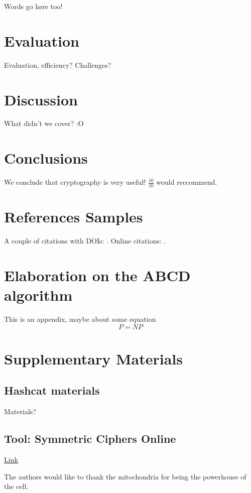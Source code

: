 \documentclass[acmlarge]{acmart}
\begin{document}
Words go here too!

\section{Evaluation}\label{sec:evaluation}

Evaluation, efficiency? Challenges?

\section{Discussion}\label{sec:discussion}

What didn't we cover? :O

\section{Conclusions}\label{sec:conclusions}

We conclude that cryptography is very useful! $\frac{10}{10}$ would reccommend.

\section{References Samples}

A couple of citations with DOIs: \cite{2004:ITE:1009386.1010128, Kirschmer:2010:AEI:1958016.1958018}. Online citations: \cite{TUGInstmem, Thornburg01, CTANacmart}.

\appendix
\section{Elaboration on the ABCD algorithm}

This is an appendix, maybe about some equation
\begin{displaymath}
P=NP
\end{displaymath}

\section{Supplementary Materials}

\subsection{Hashcat materials}

Materials?

\subsection{Tool: Symmetric Ciphers Online }

\href{http://symmetric-ciphers.online-domain-tools.com/}{Link}

\begin{acks}

The authors would like to thank the mitochondria for being the powerhouse of the cell.

\end{acks}



\end{document}
